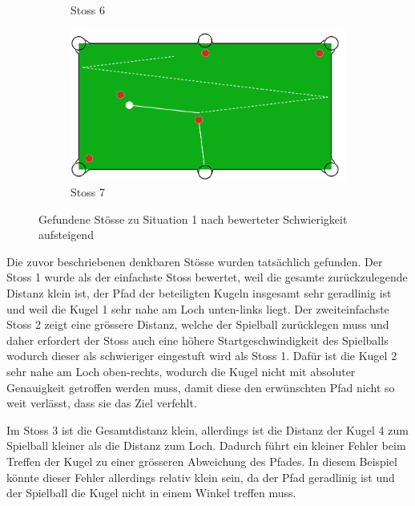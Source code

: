 \begin{figure}[h!]
\begin{subfigure}[b]{0.3\textwidth}
        \caption{Stoss 6}
        \label{fig:situation_1_solution_6}
    \end{subfigure}
    \hfill
    \begin{subfigure}[b]{0.3\textwidth}
        \centering
        \includegraphics[width=1.0\linewidth]{../common/04_results/resources/simple_search/situation_diverse_solution_7.PNG}
        \caption{Stoss 7}
        \label{fig:situation_1_solution_7}
    \end{subfigure}
    \caption{Gefundene Stösse zu Situation 1 nach bewerteter Schwierigkeit aufsteigend}
    \label{fig:situation_1_solutions}
\end{figure}

Die zuvor beschriebenen denkbaren Stösse wurden tatsächlich gefunden.
Der Stoss 1 wurde als der einfachste Stoss bewertet, weil die gesamte zurückzulegende Distanz klein ist,
der Pfad der beteiligten Kugeln insgesamt sehr geradlinig ist und weil die Kugel 1 sehr nahe am Loch unten-links liegt.
Der zweiteinfachste Stoss 2 zeigt eine grössere Distanz, welche der Spielball zurücklegen muss und daher erfordert
der Stoss auch eine höhere Startgeschwindigkeit des Spielballs wodurch dieser als schwieriger eingestuft wird als Stoss 1.
Dafür ist die Kugel 2 sehr nahe am Loch oben-rechts, wodurch die Kugel nicht mit absoluter Genauigkeit getroffen werden
muss, damit diese den erwünschten Pfad nicht so weit verlässt, dass sie das Ziel verfehlt.

Im Stoss 3 ist die Gesamtdistanz klein, allerdings ist die Distanz der Kugel 4 zum Spielball kleiner als die Distanz zum Loch.
Dadurch führt ein kleiner Fehler beim Treffen der Kugel zu einer grösseren Abweichung des Pfades.
In diesem Beispiel könnte dieser Fehler allerdings relativ klein sein, da der Pfad geradlinig ist und der Spielball die Kugel
nicht in einem Winkel treffen muss.

